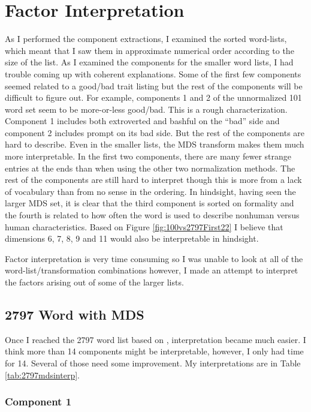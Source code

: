 \documentclass[eric_thesis.tex]{subfiles}
\begin{document}
\chapter{Factor Interpretation}

As I performed the component extractions, I examined the sorted word-lists, 
which meant that I saw them in approximate numerical order according to the size 
of the list. As I examined the components for the smaller word lists, I had 
trouble coming up with coherent explanations. Some of the first few components 
seemed related to a good/bad trait listing but the rest of the components will 
be difficult to figure out. For example, components 1 and 2 of the unnormalized 
101 word set seem to be more-or-less good/bad. This is a rough characterization. 
Component 1 includes both extroverted and bashful on the ``bad'' side and 
component 2 includes prompt on its bad side. But the rest of the components are 
hard to describe. Even in the smaller lists, the MDS transform makes them much 
more interpretable. In the first two components, there are many fewer strange 
entries at the ends than when using the other two normalization methods. The 
rest of the components are still hard to interpret though this is more from a 
lack of vocabulary than from no sense in the ordering. In hindsight, having seen 
the larger MDS set, it is clear that the third component is sorted on formality 
and the fourth is related to how often the word is used to describe nonhuman 
versus human characteristics. Based on Figure 
\ref{fig:100vs2797First22} I believe that dimensions 6, 7, 8, 9 and 11
would also be interpretable in hindsight.

Factor interpretation is very time consuming so I was unable to look at all of 
the word-list/transformation combinations however, I made an attempt to 
interpret the factors arising out of some of the larger lists.

\section{2797 Word with MDS}

Once I reached the 2797 word list based on \citep{Norman1967}, interpretation 
became much easier. I think more than 14 components might be interpretable, 
however, I only had time for 14. Several of those need some improvement. 
My interpretations are in Table
\ref{tab:2797mdsinterp}.

\subsection{Component 1}
\end{document}
